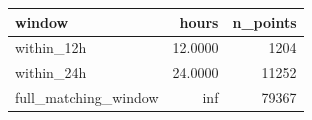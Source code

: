 \begin{tabular}{lrr}
\toprule
window & hours & n_points \\
\midrule
within_12h & 12.0000 & 1204 \\
within_24h & 24.0000 & 11252 \\
full_matching_window & inf & 79367 \\
\bottomrule
\end{tabular}
